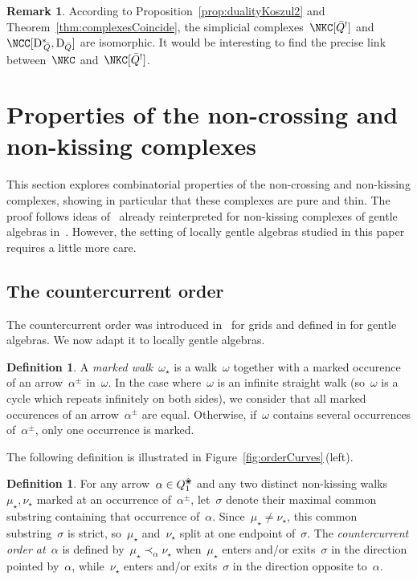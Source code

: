 \documentclass{amsart}
\theoremstyle{definition}
\newtheorem{definition}[theorem]{Definition}
\newtheorem{remark}[theorem]{Remark}
\newcommand{\fref}[1]{Figure~\ref{#1}} %
\newcommand{\darkblue}{\color{darkblue}} %
\newcommand{\defn}[1]{\textsl{\darkblue #1}} %
\newcommand{\blossom}{^\text{\ding{96}}} %
\newcommand{\dual}{^*} %
\newcommand{\dissection}{\mathrm{D}} %
\newcommand{\koszul}{^!} %
\begin{document}
\begin{remark}
According to Proposition~\ref{prop:dualityKoszul2} and Theorem~\ref{thm:complexesCoincide}, the simplicial complexes~$\NKC[\bar Q\koszul]$ and~$\NCC[{\dissection\dual\!\!_{\bar Q}}, \dissection_{\bar Q}]$ are isomorphic.
It would be interesting to find the precise link between~$\NKC$ and~$\NKC[\bar Q\koszul]$.
\end{remark}

\section{Properties of the non-crossing and non-kissing complexes}\label{sec:propertiesOfComplexes}

This section explores combinatorial properties of the non-crossing and non-kissing complexes, showing in particular that these complexes are pure and thin.
The proof follows ideas of~\cite{McConville, GarverMcConville} already reinterpreted for non-kissing complexes of gentle algebras in~\cite{PaluPilaudPlamondon}.
However, the setting of locally gentle algebras studied in this paper requires a little more care.

\subsection{The countercurrent order}

The countercurrent order was introduced in~\cite{McConville} for grids and defined in \cite{PaluPilaudPlamondon} for gentle algebras.
We now adapt it to locally gentle algebras.

\begin{definition}
A \defn{marked walk}~$\omega_\star$ is a walk~$\omega$ together with a marked occurence of an arrow~$\alpha^{\pm}$ in~$\omega$.
In the case where~$\omega$ is an infinite straight walk (so~$\omega$ is a cycle which repeats infinitely on both sides), we consider that all marked occurences of an arrow~$\alpha^\pm$ are equal.
Otherwise, if~$\omega$ contains several occurrences of~$\alpha^\pm$, only one occurrence is marked.
\end{definition}

The following definition is illustrated in \fref{fig:orderCurves}\,(left).

\begin{definition}
\label{def:orderForWalks}
For any arrow~$\alpha \in Q\blossom_1$ and any two distinct non-kissing walks~$\mu_\star, \nu_\star$ marked at an occurrence of~$\alpha^\pm$,
let~$\sigma$ denote their maximal common substring containing that occurrence of~$\alpha$.
Since~$\mu_\star \ne \nu_\star$, this common substring~$\sigma$ is strict, so~$\mu_\star$ and~$\nu_\star$ split at one endpoint of~$\sigma$.
The \defn{countercurrent order at~$\alpha$} is defined by~$\mu_\star \prec_\alpha \nu_\star$ when~$\mu_\star$ enters and/or exits~$\sigma$ in the direction pointed by~$\alpha$, while~$\nu_\star$ enters and/or exits~$\sigma$ in the direction opposite to~$\alpha$.
\end{definition}
\end{document}
